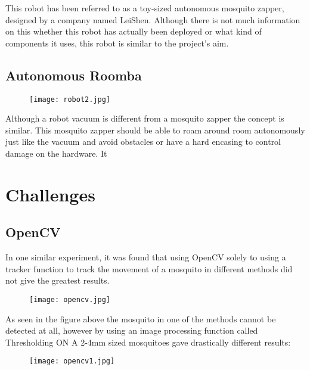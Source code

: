 \documentclass[11pt]{article}
\begin{document}
 This robot has been referred to as a toy-sized autonomous mosquito zapper, designed by a company named LeiShen. Although there is not much information on this whether this robot has actually been deployed or what kind of components it uses, this robot is similar to the project's aim.


\subsection{Autonomous Roomba}
  \begin{center}
	
	
	\begin{figure}[H]
		\centering
		\texttt{[image: robot2.jpg]}
		
		\label{fig:Robot}
	\end{figure}
\end{center}

Although a robot vacuum is different from a mosquito zapper the concept is similar. This mosquito zapper should be able to roam around room autonomously just like the vacuum and avoid obstacles or have a hard encasing to control damage on the hardware. It 
\section{Challenges}
\subsection{OpenCV}

 In one similar experiment, it was found that using OpenCV solely to using a tracker function to track the movement of a mosquito in different methods did not give the greatest results. 
 \begin{center}
 	
 	
 	\begin{figure}[H]
 		\centering
 		\texttt{[image: opencv.jpg]}

 		\label{fig:opencv}
 	\end{figure}
 \end{center}
 As seen in the figure above the mosquito in one of the methods cannot be detected at all, however by using an image processing function called Thresholding ON A 2-4mm sized mosquitoes gave drastically different results:\cite{rakhmatulin_2021_raspberry}
 
  
 \begin{center}
 	
 	
 	\begin{figure}[H]
 		\centering
 		\texttt{[image: opencv1.jpg]}
 	
 		
 	\end{figure}
 \end{center}
 
\end{document}
